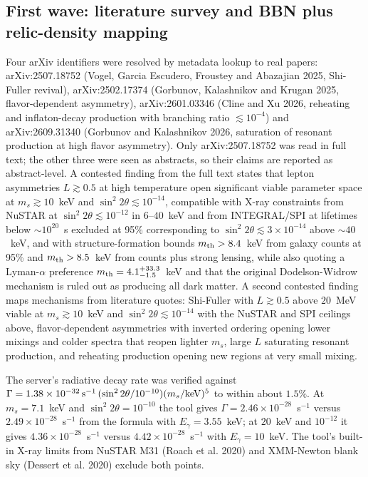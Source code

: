 \documentclass[11pt,a4paper]{article}
\begin{document}
\subsection{First wave: literature survey and BBN plus relic-density mapping}
Four arXiv identifiers were resolved by metadata lookup to real papers: arXiv:2507.18752 (Vogel, Garcia Escudero, Froustey and Abazajian 2025, Shi-Fuller revival), arXiv:2502.17374 (Gorbunov, Kalashnikov and Krugan 2025, flavor-dependent asymmetry), arXiv:2601.03346 (Cline and Xu 2026, reheating and inflaton-decay production with branching ratio $\lesssim10^{-4}$) and arXiv:2609.31340 (Gorbunov and Kalashnikov 2026, saturation of resonant production at high flavor asymmetry). Only arXiv:2507.18752 was read in full text; the other three were seen as abstracts, so their claims are reported as abstract-level. A contested finding from the full text states that lepton asymmetries $L\gtrsim0.5$ at high temperature open significant viable parameter space at $m_{s}\gtrsim10$~keV and $\sin^{2}2\theta\lesssim10^{-14}$, compatible with X-ray constraints from NuSTAR at $\sin^{2}2\theta\lesssim10^{-12}$ in $6$--$40$~keV and from INTEGRAL/SPI at lifetimes below $\sim10^{20}$~s excluded at 95\% corresponding to $\sin^{2}2\theta\lesssim3\times10^{-14}$ above $\sim40$~keV, and with structure-formation bounds $m_{\rm th}>8.4$~keV from galaxy counts at 95\% and $m_{\rm th}>8.5$~keV from counts plus strong lensing, while also quoting a Lyman-$\alpha$ preference $m_{\rm th}=4.1^{+33.3}_{-1.5}$~keV and that the original Dodelson-Widrow mechanism is ruled out as producing all dark matter. A second contested finding maps mechanisms from literature quotes: Shi-Fuller with $L\gtrsim0.5$ above $20$~MeV viable at $m_{s}\gtrsim10$~keV and $\sin^{2}2\theta\lesssim10^{-14}$ with the NuSTAR and SPI ceilings above, flavor-dependent asymmetries with inverted ordering opening lower mixings and colder spectra that reopen lighter $m_{s}$, large $L$ saturating resonant production, and reheating production opening new regions at very small mixing.

The server's radiative decay rate was verified against $\Gamma=1.38\times10^{-32}\,{\rm s^{-1}}\,(\sin^{2}2\theta/10^{-10})(m_{s}/{\rm keV})^{5}$ to within about $1.5\%$. At $m_{s}=7.1$~keV and $\sin^{2}2\theta=10^{-10}$ the tool gives $\Gamma=2.46\times10^{-28}$~s$^{-1}$ versus $2.49\times10^{-28}$~s$^{-1}$ from the formula with $E_{\gamma}=3.55$~keV; at $20$~keV and $10^{-12}$ it gives $4.36\times10^{-28}$~s$^{-1}$ versus $4.42\times10^{-28}$~s$^{-1}$ with $E_{\gamma}=10$~keV. The tool's built-in X-ray limits from NuSTAR M31 (Roach et al. 2020) and XMM-Newton blank sky (Dessert et al. 2020) exclude both points.
\end{document}
